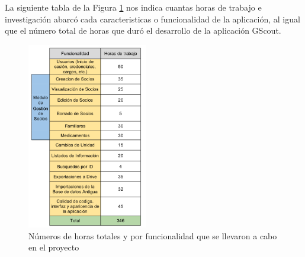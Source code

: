 


La siguiente tabla de la Figura \ref{fig:presupuesto} nos indica cuantas horas de trabajo e investigación abarcó cada caracteristicas o funcionalidad de la aplicación, al igual que 
el número total de horas que duró el desarrollo de la aplicación GScout.

\begin{figure}[H]
\begin{center}
\includegraphics[width=0.47\textwidth]{images/presupuesto.jpg}
\caption{Números de horas totales y por funcionalidad que se llevaron a cabo en el proyecto}
\label{fig:presupuesto}
\end{center}
\end{figure}


